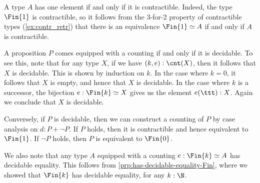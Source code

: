 \begin{eg}
  A type $A$ has one element if and only if it is contractible. Indeed, the type $\Fin{1}$ is contractible, so it follows from the 3-for-2 property of contractible types (\cref{ex:contr_retr}) that there is an equivalence $\Fin{1}\simeq A$ if and only if $A$ is contractible.   
\end{eg}

\begin{eg}\label{rmk:count-decidable-proposition}
  A proposition $P$ comes equipped with a counting if and only if it is decidable. To see this, note that for any type $X$, if we have $(k,e):\cnt(X)$, then it follows that $X$ is decidable. This is shown by induction on $k$. In the case where $k=0$, it follows that $X$ is empty, and hence that $X$ is decidable. In the case where $k$ is a successor, the bijection $e:\Fin{k}\simeq X$ gives us the element $e(\ttt):X$. Again we conclude that $X$ is decidable.

  Conversely, if $P$ is decidable, then we can construct a counting of $P$ by case analysis on $d:P+\neg P$. If $P$ holds, then it is contractible and hence equivalent to $\Fin{1}$. If $\neg P$ holds, then $P$ is equivalent to $\Fin{0}$.  
\end{eg}

\begin{rmk}\label{rmk:has-decidable-equality-count}
  We also note that any type $A$ equipped with a counting $e:\Fin{k}\simeq A$ has decidable equality. This follows from \cref{prp:has-decidable-equality-Fin}, where we showed that $\Fin{k}$ has decidable equality, for any $k:\N$.
\end{rmk}

